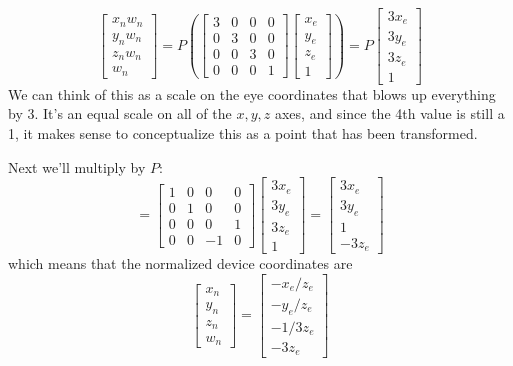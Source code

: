 \documentclass[letterpaper, 11pt]{article}
\begin{document}
\begin{enumerate}
{\begin{minipage}{6in}
    \[
    \left[ \begin{array}{c}
        x_n w_n \\
        y_n w_n \\
        z_n w_n \\
        w_n
    \end{array}\right]
    = P
    \left(
    \left[
    \begin{array}{cccc}
      3 & 0 & 0 & 0 \\
      0 & 3 & 0 & 0 \\
      0 & 0 & 3 & 0 \\
      0 & 0 & 0 & 1
    \end{array}
    \right]
    \left[
    \begin{array}{c}
    x_e \\ y_e \\ z_e \\ 1
    \end{array}
    \right]
    \right)
    = P
    \left[
    \begin{array}{c}
    3x_e \\ 3y_e \\ 3z_e \\ 1
    \end{array}
    \right]
    \]
    We can think of this as a scale on the eye coordinates that blows up everything by 3. It's an equal scale on all of the $x,y,z$ axes, and since the 4th value is still a 1, it makes sense to conceptualize this as a point that has been transformed.

    Next we'll multiply by $P$:
    \[
    = \left[
    \begin{array}{cccc}
      1 & 0 & 0 & 0 \\
      0 & 1 & 0 & 0 \\
      0 & 0 & 0 & 1 \\
      0 & 0 & -1 & 0
    \end{array}
    \right]
    \left[
    \begin{array}{c}
    3x_e \\ 3y_e \\ 3z_e \\ 1
    \end{array}
    \right]
    = 
    \left[
    \begin{array}{c}
    3x_e \\ 3y_e \\ 1 \\ -3z_e
    \end{array}
    \right]
    \]
which means that the normalized device coordinates are
    \[
    \left[ \begin{array}{c}
        x_n \\ y_n \\ z_n \\ w_n
    \end{array}\right]
    =
    \left[ \begin{array}{c} 
        -x_e / z_e \\ 
        -y_e / z_e \\
        -1 / 3z_e \\
        -3z_e
    \end{array}\right]
    \]


\end{minipage}}
\end{enumerate}
\end{document}

